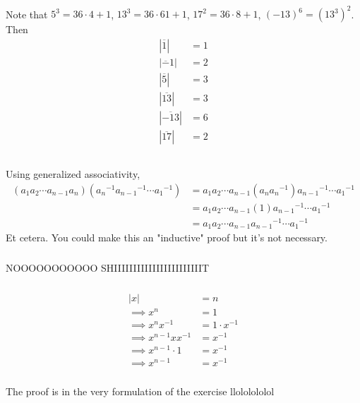 \documentclass{article}
\newcommand{\abs}[1]{| #1 |}
\newcommand{\inv}[1]{ {#1}^{-1} }
\renewcommand{\bar}{\overline}
\begin{document}
\subsubsection{}
Note that $5^3 = 36\cdot 4 + 1$, $13^3 = 36\cdot 61 + 1$, $17^2 = 36\cdot 8 +1 $, $(-13)^6 = (13^3)^2$. Then
\begin{align*}
\abs{\bar 1 } &= 1\\
\abs{\bar -1 } &= 2\\
\abs{\bar 5 } &= 3\\
\abs{\bar{ 13} } &= 3\\
\abs{\bar{ -13} } &= 6\\
\abs{\bar {17} } &= 2\\
\end{align*}
\subsubsection{}
Using generalized associativity,
\begin{align*}
(a_1a_2\cdots a_{n-1}a_n)(\inv{a_n}\inv{a_{n-1}}\cdots \inv{a_1})
&= a_1a_2\cdots a_{n-1}(a_n\inv{a_n})\inv{a_{n-1}}\cdots \inv{a_1}\\
&= a_1a_2\cdots a_{n-1}(1)\inv{a_{n-1}}\cdots \inv{a_1}\\
&= a_1a_2\cdots a_{n-1}\inv{a_{n-1}}\cdots \inv{a_1}
\end{align*}
Et cetera. You could make this an "inductive" proof but it's not necessary.
\subsubsection{}
NOOOOOOOOOOO SHIIIIIIIIIIIIIIIIIIIIIIIT
\subsubsection{}
\begin{align*}
\abs{x} &= n\\
\implies x^n &= 1\\
\implies x^n\inv{x} &= 1\cdot\inv{x}\\
\implies x^{n-1}x\inv{x} &= \inv{x}\\
\implies x^{n-1}\cdot 1 &= \inv{x}\\
\implies x^{n-1} &= \inv{x}
\end{align*}
\subsubsection{}
The proof is in the very formulation of the exercise llololololol
\end{document}
